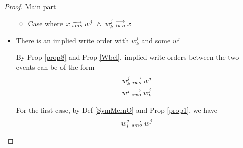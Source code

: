\begin{proof}{Main part}
\begin{itemize}
\begin{itemize}

                            \item Case where $x\stackrel{\longrightarrow}{_{smo}}w^j \ \wedge \ w_k^j\stackrel{\longrightarrow}{_{iwo}}x$


                        \end{itemize}
                        
                    \item There is an implied write order with $w_k^j$ and some $w^j$
                    
                        By Prop \ref{prop8} and Prop \ref{Wbel}, implied write orders between the two events can be of the form 
                        \begin{align*}
                            w_k^j\stackrel{\longrightarrow}{_{iwo}}w^j \\
                            w^j\stackrel{\longrightarrow}{_{iwo}}w_k^j 
                        \end{align*}

                        For the first case, by Def \ref{SymMemO} and Prop \ref{prop1}, we have
                        \begin{align*}
                            w_i^j\stackrel{\longrightarrow}{_{smo}}w^j
                        \end{align*}


\end{itemize}
\end{proof}
